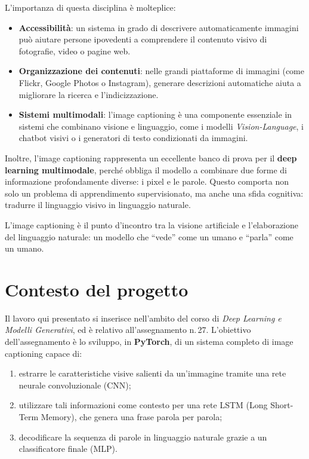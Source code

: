 \documentclass[11pt,a4paper]{report}
\begin{document}
L’importanza di questa disciplina è molteplice:
\begin{itemize}
  \item \textbf{Accessibilità}: un sistema in grado di descrivere automaticamente immagini può aiutare persone ipovedenti a comprendere il contenuto visivo di fotografie, video o pagine web.
  \item \textbf{Organizzazione dei contenuti}: nelle grandi piattaforme di immagini (come Flickr, Google Photos o Instagram), generare descrizioni automatiche aiuta a migliorare la ricerca e l’indicizzazione.
  \item \textbf{Sistemi multimodali}: l’image captioning è una componente essenziale in sistemi che combinano visione e linguaggio, come i modelli \emph{Vision-Language}, i chatbot visivi o i generatori di testo condizionati da immagini.
\end{itemize}

Inoltre, l’image captioning rappresenta un eccellente banco di prova per il \textbf{deep learning multimodale}, perché obbliga il modello a combinare due forme di informazione profondamente diverse: i pixel e le parole.  
Questo comporta non solo un problema di apprendimento supervisionato, ma anche una sfida cognitiva: tradurre il linguaggio visivo in linguaggio naturale.

\begin{tcolorbox}[title=Messaggio chiave]
L'image captioning è il punto d'incontro tra la visione artificiale e l'elaborazione del linguaggio naturale: un modello che “vede” come un umano e “parla” come un umano.
\end{tcolorbox}


\section{Contesto del progetto}

Il lavoro qui presentato si inserisce nell’ambito del corso di \emph{Deep Learning e Modelli Generativi}, ed è relativo all’assegnamento n.\,27.  
L’obiettivo dell’assegnamento è lo sviluppo, in \textbf{PyTorch}, di un sistema completo di image captioning capace di:
\begin{enumerate}
  \item estrarre le caratteristiche visive salienti da un’immagine tramite una rete neurale convoluzionale (CNN);
  \item utilizzare tali informazioni come contesto per una rete LSTM (Long Short-Term Memory), che genera una frase parola per parola;
  \item decodificare la sequenza di parole in linguaggio naturale grazie a un classificatore finale (MLP).
\end{enumerate}
\end{document}

